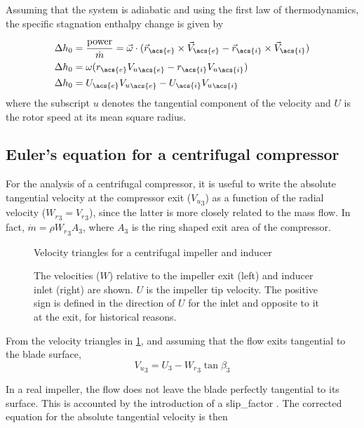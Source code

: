 Assuming that the system is adiabatic and using the first law of thermodynamics, the specific stagnation enthalpy change is given by

\begin{align}
    \Delta h_0 &= \frac{\text{power}}{\dot{m}} 
             = \vec{\omega} \cdot (\vec{r}_{\acs{e}}\cross\vec{V}_{\acs{e}} - \vec{r}_{\acs{i}}\cross\vec{V}_{\acs{i}}) \\
    \Delta h_0 &= \omega (r_{\acs{e}} {V_u}_{\acs{e}} - r_{\acs{i}} {V_u}_{\acs{i}}) \\
    \Delta h_0 &= U_{\acs{e}} {V_u}_{\acs{e}} - U_{\acs{i}} {V_u}_{\acs{i}} 
    \label{eqn:euler}
\end{align}
where the subscript $u$ denotes the tangential component of the velocity and $U$ is the rotor speed at its mean square radius.

\subsection{Euler's equation for a centrifugal compressor}

For the analysis of a centrifugal compressor, 
it is useful to write the absolute tangential velocity at the compressor exit (${V_u}_3$)
as a function of the radial velocity (${W_r}_3={V_r}_3$),
since the latter is more closely related to the mass flow. 
In fact, $\dot{m} = \rho {W_r}_3 A_3$, where $A_3$ is the ring shaped exit area of the compressor.

\begin{figure}[bp]
    \caption{Velocity triangles for a centrifugal impeller and inducer}
    \label{fig:compressor_schematic}
    
    \source{\authorsfigure}
    \caption*{The velocities ($W$) relative to the impeller exit (left) and inducer inlet (right) are shown. $U$ is the impeller tip velocity. The positive sign is defined in the direction of $U$ for the inlet and opposite to it at the exit, for historical reasons.}
\end{figure}

From the velocity triangles in \cref{fig:compressor_schematic}, 
and assuming that the flow exits tangential to the blade surface,
\begin{equation}
    \label{eqn:V_u_3}
    {V_u}_3 = U_3 - {W_r}_3 \tan\beta_3
\end{equation}

In a real impeller, the flow does not leave the blade perfectly tangential to its surface. 
This is accounted by the introduction of a \acf{slip_factor} \cite{Wiesner1967,Aungier1995}.
The corrected equation for the absolute tangential velocity is then

